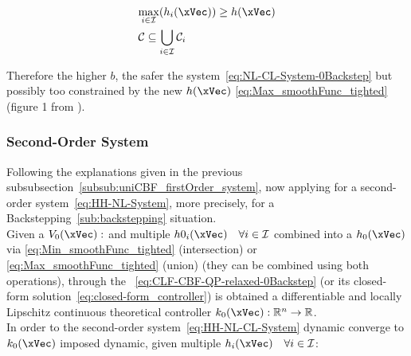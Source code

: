 \begin{description}
    \begin{subequations}
        \begin{align}
            &\underset{i \in \mathcal{I}}{\max} (h_i(\xVec)) \geq h(\xVec) %
            \label{eq:Union_CBF_Comparation_tighted} \\
            &\mathcal{C} \subseteq \bigcup_{i \in \mathcal{I}} \mathcal{C}_i
            \label{eq:Union_SafeSet_Comparation_tighted}
        \end{align}
    \end{subequations}

    Therefore the higher \(b\), the safer the system~\ref{eq:NL-CL-System-0Backstep} but possibly too constrained by the new  \(h(\xVec)\) \ref{eq:Max_smoothFunc_tighted} (figure 1 from \cite{molnar2023composing}). 
\end{description}



\subsubsection{Second-Order System}
\label{subsub:uniCBF_secondOrder_system}

Following the explanations given in the previous subsubsection~\ref{subsub:uniCBF_firstOrder_system}, now applying for a second-order system~\ref{eq:HH-NL-System}, more precisely, for a Backstepping~\ref{sub:backstepping} situation. \\

Given a  \(V_0(\xVec): \) and multiple  \(h0_i(\xVec) \quad \forall i \in \mathcal{I}\) combined into a  \(h_0(\xVec)\) via \ref{eq:Min_smoothFunc_tighted} (intersection) or \ref{eq:Max_smoothFunc_tighted} (union) (they can be combined using both operations), through the ~\ref{eq:CLF-CBF-QP-relaxed-0Backstep} (or its closed-form solution~\ref{eq:closed-form_controller}) is obtained a differentiable and locally Lipschitz continuous theoretical controller \(k_0(\xVec): \mathbb{R}^n \to \mathbb{R}\). \\

In order to the second-order system~\ref{eq:HH-NL-CL-System} dynamic converge to \(k_0(\xVec)\) imposed dynamic, given multiple  \(h_i(\xVec) \quad \forall i \in \mathcal{I} \):

